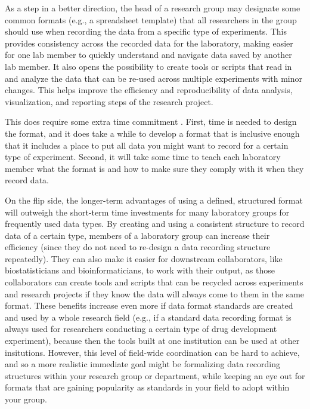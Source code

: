 \documentclass[]{tufte-book}
\begin{document}
As a step in a better direction, the head of a research group may
designate some common formats (e.g., a spreadsheet template) that all
researchers in the group should use when recording the data from a specific type
of experiments. This provides consistency across the recorded data for the
laboratory, making easier for one lab member to quickly understand and navigate
data saved by another lab member. It also opens the possibility to create tools
or scripts that read in and analyze the data that can be re-used across multiple
experiments with minor changes. This helps improve the efficiency and
reproducibility of data analysis, visualization, and reporting steps of the
research project.

This does require some extra time commitment \citep{brazma2006standards}. First, time
is needed to design the format, and it does take a while to develop a format
that is inclusive enough that it includes a place to put all data you might want
to record for a certain type of experiment. Second, it will take some time to
teach each laboratory member what the format is and how to make sure they comply
with it when they record data.

On the flip side, the longer-term advantages of using a defined, structured
format will outweigh the short-term time investments for many laboratory groups
for frequently used data types. By creating and using a consistent structure to
record data of a certain type, members of a laboratory group can increase their
efficiency (since they do not need to re-design a data recording structure
repeatedly). They can also make it easier for downstream collaborators, like
biostatisticians and bioinformaticians, to work with their output, as those
collaborators can create tools and scripts that can be recycled across
experiments and research projects if they know the data will always come to them
in the same format. These benefits increase even more if data format standards
are created and used by a whole research field (e.g., if a standard data
recording format is always used for researchers conducting a certain type of
drug development experiment), because then the tools built at one institution
can be used at other insitutions. However, this level of field-wide coordination
can be hard to achieve, and so a more realistic immediate goal might be
formalizing data recording structures within your research group or department,
while keeping an eye out for formats that are gaining popularity as standards in
your field to adopt within your group.
\end{document}
